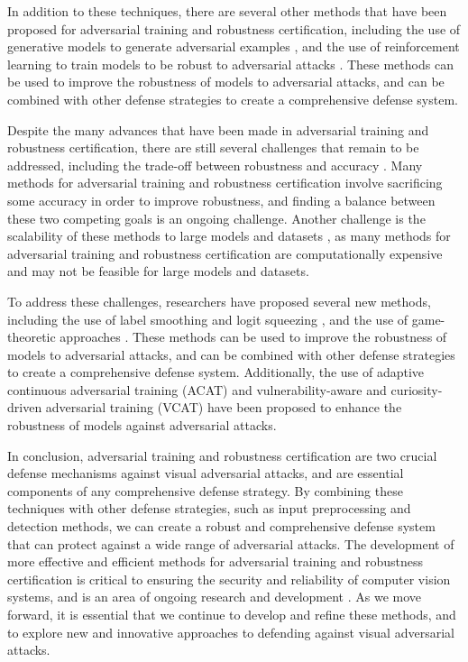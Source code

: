 \documentclass[11pt]{article}
\begin{document}
In addition to these techniques, there are several other methods that have been proposed for adversarial training and robustness certification, including the use of generative models to generate adversarial examples \cite{ref118}, and the use of reinforcement learning to train models to be robust to adversarial attacks \cite{ref119}. These methods can be used to improve the robustness of models to adversarial attacks, and can be combined with other defense strategies to create a comprehensive defense system.

Despite the many advances that have been made in adversarial training and robustness certification, there are still several challenges that remain to be addressed, including the trade-off between robustness and accuracy \cite{ref120}. Many methods for adversarial training and robustness certification involve sacrificing some accuracy in order to improve robustness, and finding a balance between these two competing goals is an ongoing challenge. Another challenge is the scalability of these methods to large models and datasets \cite{ref121}, as many methods for adversarial training and robustness certification are computationally expensive and may not be feasible for large models and datasets.

To address these challenges, researchers have proposed several new methods, including the use of label smoothing and logit squeezing \cite{ref122}, and the use of game-theoretic approaches \cite{ref123}. These methods can be used to improve the robustness of models to adversarial attacks, and can be combined with other defense strategies to create a comprehensive defense system. Additionally, the use of adaptive continuous adversarial training (ACAT) \cite{ref124} and vulnerability-aware and curiosity-driven adversarial training (VCAT) \cite{ref125} have been proposed to enhance the robustness of models against adversarial attacks.

In conclusion, adversarial training and robustness certification are two crucial defense mechanisms against visual adversarial attacks, and are essential components of any comprehensive defense strategy. By combining these techniques with other defense strategies, such as input preprocessing and detection methods, we can create a robust and comprehensive defense system that can protect against a wide range of adversarial attacks. The development of more effective and efficient methods for adversarial training and robustness certification is critical to ensuring the security and reliability of computer vision systems, and is an area of ongoing research and development \cite{ref126}. As we move forward, it is essential that we continue to develop and refine these methods, and to explore new and innovative approaches to defending against visual adversarial attacks.
\end{document}
